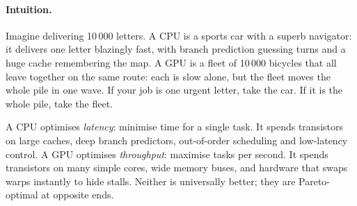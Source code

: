 \paragraph{Intuition.} Imagine delivering 10\,000 letters. A CPU is a sports car with a superb navigator: it delivers one letter blazingly fast, with branch prediction guessing turns and a huge cache remembering the map. A GPU is a fleet of 10\,000 bicycles that all leave together on the same route: each is slow alone, but the fleet moves the whole pile in one wave. If your job is one urgent letter, take the car. If it is the whole pile, take the fleet.

A CPU optimises \emph{latency}: minimise time for a single task. It spends transistors on large caches, deep branch predictors, out-of-order scheduling and low-latency control. A GPU optimises \emph{throughput}: maximise tasks per second. It spends transistors on many simple cores, wide memory buses, and hardware that swaps warps instantly to hide stalls. Neither is universally better; they are Pareto-optimal at opposite ends.

